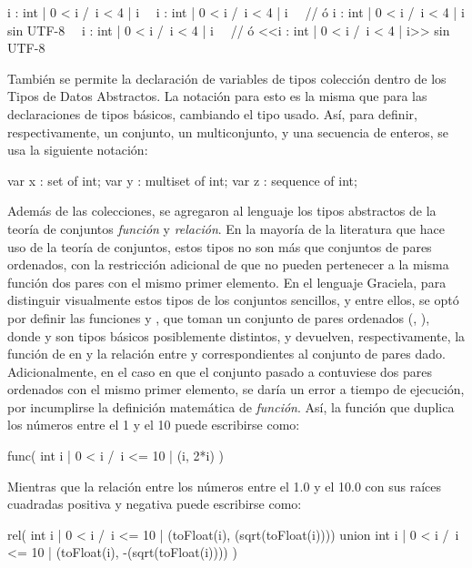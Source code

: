 \begin{gracielacode}
{i : int | 0 < i /\ i < 4 | i}
~\Lbag~i : int | 0 < i /\ i < 4 | i~\Rbag~
  // ó {{i : int | 0 < i /\ i < 4 | i}} sin UTF-8
~\Lseq~i : int | 0 < i /\ i < 4 | i~\Rseq~
  // ó <<i : int | 0 < i /\ i < 4 | i>> sin UTF-8
\end{gracielacode}

También se permite la declaración de variables de tipos colección dentro de los
Tipos de Datos Abstractos. La notación para esto es la misma que para las
declaraciones de tipos básicos, cambiando el tipo usado. Así, para definir,
respectivamente, un conjunto, un multiconjunto, y una secuencia de enteros, se
usa la siguiente notación:

\begin{gracielacode}
var x : set of int;
var y : multiset of int;
var z : sequence of int;
\end{gracielacode}

Además de las colecciones, se agregaron al lenguaje los tipos abstractos de la
teoría de conjuntos \textit{función} y \textit{relación}. En la mayoría de la
literatura que hace uso de la teoría de conjuntos, estos tipos no son más que
conjuntos de pares ordenados, con la restricción adicional de que no pueden
pertenecer a la misma función dos pares con el mismo primer elemento. En el
lenguaje Graciela, para distinguir visualmente estos tipos de los conjuntos
sencillos, y entre ellos, se optó por definir las funciones  y
, que toman un conjunto de pares ordenados (, ),
donde  y  son tipos básicos posiblemente distintos, y
devuelven, respectivamente, la función de  en  y la relación
entre  y  correspondientes al conjunto de pares dado.
Adicionalmente, en el caso en que el conjunto pasado a  contuviese
dos pares ordenados con el mismo primer elemento, se daría un error a tiempo de
ejecución, por incumplirse la definición matemática de \textit{función}. Así, la
función que duplica los números entre el 1 y el 10 puede escribirse como:

\begin{gracielacode}
func({ int i | 0 < i /\ i <= 10 | (i, 2*i) })
\end{gracielacode}

Mientras que la relación entre los números entre el 1.0 y el 10.0 con sus raíces
cuadradas positiva y negativa puede escribirse como:

\begin{gracielacode}
rel(
  { int i | 0 < i /\ i <= 10 |
    (toFloat(i),  (sqrt(toFloat(i))))
  } union
  { int i | 0 < i /\ i <= 10 |
    (toFloat(i), -(sqrt(toFloat(i))))
  }
)
\end{gracielacode}

